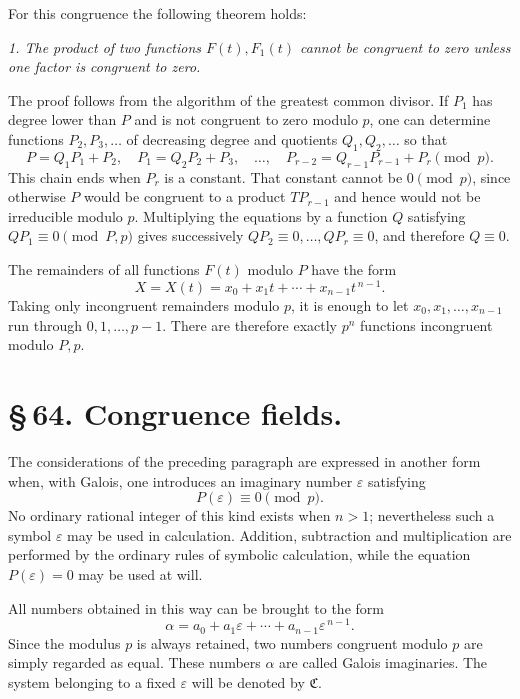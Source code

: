 \documentclass[11pt]{article}
\begin{document}
For this congruence the following theorem holds:

\emph{1. The product of two functions $F(t),F_1(t)$ cannot be congruent to zero unless one factor is congruent to zero.}

The proof follows from the algorithm of the greatest common divisor. If $P_1$ has degree lower than $P$ and is not congruent to zero modulo $p$, one can determine functions $P_2,P_3,\ldots$ of decreasing degree and quotients $Q_1,Q_2,\ldots$ so that
\begin{equation}
 P=Q_1P_1+P_2,\quad P_1=Q_2P_2+P_3,\quad
 \ldots,\quad P_{r-2}=Q_{r-1}P_{r-1}+P_r\pmod p. \tag{6}
\end{equation}
This chain ends when $P_r$ is a constant. That constant cannot be $0\pmod p$, since otherwise $P$ would be congruent to a product $TP_{r-1}$ and hence would not be irreducible modulo $p$. Multiplying the equations by a function $Q$ satisfying $QP_1\equiv0\pmod {P,p}$ gives successively $QP_2\equiv0,\ldots,QP_r\equiv0$, and therefore $Q\equiv0$.

The remainders of all functions $F(t)$ modulo $P$ have the form
\begin{equation}
 X=X(t)=x_0+x_1t+\cdots+x_{n-1}t^{\,n-1}. \tag{7}
\end{equation}
Taking only incongruent remainders modulo $p$, it is enough to let $x_0,x_1,\ldots,x_{n-1}$ run through $0,1,\ldots,p-1$. There are therefore exactly $p^n$ functions incongruent modulo $P,p$.

\section*{\S\,64. Congruence fields.}

The considerations of the preceding paragraph are expressed in another form when, with Galois, one introduces an imaginary number $\varepsilon$ satisfying
\begin{equation}
 P(\varepsilon)\equiv0\pmod p. \tag{1}
\end{equation}
No ordinary rational integer of this kind exists when $n>1$; nevertheless such a symbol $\varepsilon$ may be used in calculation. Addition, subtraction and multiplication are performed by the ordinary rules of symbolic calculation, while the equation $P(\varepsilon)=0$ may be used at will.

All numbers obtained in this way can be brought to the form
\begin{equation}
 \alpha=a_0+a_1\varepsilon+\cdots+a_{n-1}\varepsilon^{\,n-1}. \tag{2}
\end{equation}
Since the modulus $p$ is always retained, two numbers congruent modulo $p$ are simply regarded as equal. These numbers $\alpha$ are called Galois imaginaries. The system belonging to a fixed $\varepsilon$ will be denoted by $\mathfrak C$.
\end{document}
